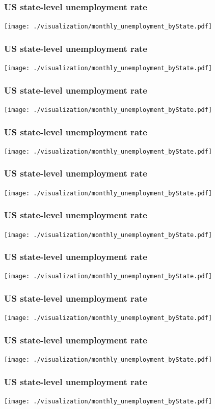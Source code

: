 \documentclass{beamer} %
\newcommand{\1}{\mathbb{1}}
\begin{document}
{				\begin{frame}[t]\frametitle{US state-level unemployment rate}
				\texttt{[image: ./visualization/monthly\_unemployment\_byState.pdf]}
				\end{frame}

				\begin{frame}[t]\frametitle{US state-level unemployment rate}
				\texttt{[image: ./visualization/monthly\_unemployment\_byState.pdf]}
				\end{frame}

				\begin{frame}[t]\frametitle{US state-level unemployment rate}
				\texttt{[image: ./visualization/monthly\_unemployment\_byState.pdf]}
				\end{frame}

				\begin{frame}[t]\frametitle{US state-level unemployment rate}
				\texttt{[image: ./visualization/monthly\_unemployment\_byState.pdf]}
				\end{frame}


				\begin{frame}[t]\frametitle{US state-level unemployment rate}
				\texttt{[image: ./visualization/monthly\_unemployment\_byState.pdf]}
				\end{frame}

				\begin{frame}[t]\frametitle{US state-level unemployment rate}
				\texttt{[image: ./visualization/monthly\_unemployment\_byState.pdf]}
				\end{frame}

				\begin{frame}[t]\frametitle{US state-level unemployment rate}
				\texttt{[image: ./visualization/monthly\_unemployment\_byState.pdf]}
				\end{frame}

				\begin{frame}[t]\frametitle{US state-level unemployment rate}
				\texttt{[image: ./visualization/monthly\_unemployment\_byState.pdf]}
				\end{frame}

				\begin{frame}[t]\frametitle{US state-level unemployment rate}
				\texttt{[image: ./visualization/monthly\_unemployment\_byState.pdf]}
				\end{frame}

				\begin{frame}[t]\frametitle{US state-level unemployment rate}
				\texttt{[image: ./visualization/monthly\_unemployment\_byState.pdf]}
				\end{frame}

}
\end{document}
